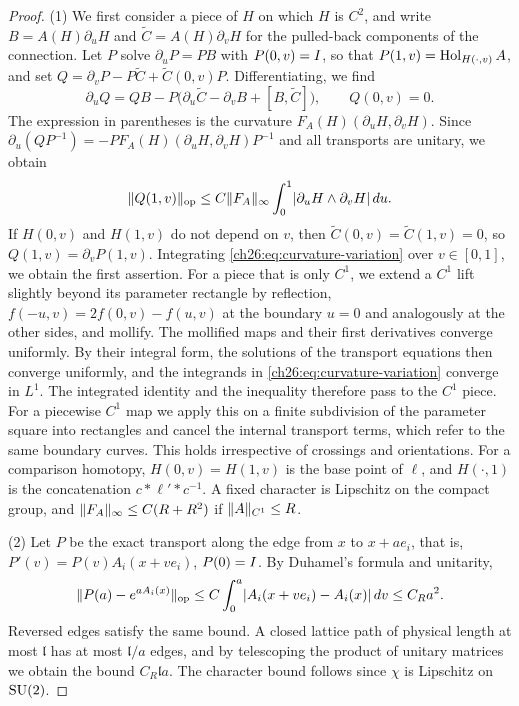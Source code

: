 \begin{proof}
(1) We first consider a piece of $H$ on which $H$ is $C^2$, and write $B=A(H)\partial_uH$ and $\widetilde C=A(H)\partial_vH$ for the pulled-back components of the connection. Let $P$ solve $\partial_uP=PB$ with $P(0,v)=I$, so that $P(1,v)=\operatorname{Hol}_{H(\cdot,v)}A$, and set $Q=\partial_vP-P\widetilde C+\widetilde C(0,v)P$. Differentiating, we find
\[
 \partial_uQ=QB-P\bigl(\partial_u\widetilde C-\partial_vB+[B,\widetilde C]\bigr),\qquad Q(0,v)=0 .
\]
The expression in parentheses is the curvature $F_A(H)(\partial_uH,\partial_vH)$. Since $\partial_u(QP^{-1})=-PF_A(H)(\partial_uH,\partial_vH)P^{-1}$ and all transports are unitary, we obtain
\begin{equation}\label{ch26:eq:curvature-variation}
 \lVert Q(1,v)\rVert_{\mathrm{op}}\le C\lVert F_A\rVert_\infty\int_0^1\lvert \partial_uH\wedge\partial_vH\rvert\,du .
\end{equation}
If $H(0,v)$ and $H(1,v)$ do not depend on $v$, then $\widetilde C(0,v)=\widetilde C(1,v)=0$, so $Q(1,v)=\partial_vP(1,v)$. Integrating \eqref{ch26:eq:curvature-variation} over $v\in[0,1]$, we obtain the first assertion. For a piece that is only $C^1$, we extend a $C^1$ lift slightly beyond its parameter rectangle by reflection, $f(-u,v)=2f(0,v)-f(u,v)$ at the boundary $u=0$ and analogously at the other sides, and mollify. The mollified maps and their first derivatives converge uniformly. By their integral form, the solutions of the transport equations then converge uniformly, and the integrands in \eqref{ch26:eq:curvature-variation} converge in $L^1$. The integrated identity and the inequality therefore pass to the $C^1$ piece. For a piecewise $C^1$ map we apply this on a finite subdivision of the parameter square into rectangles and cancel the internal transport terms, which refer to the same boundary curves. This holds irrespective of crossings and orientations. For a comparison homotopy, $H(0,v)=H(1,v)$ is the base point of $\ell$, and $H(\cdot,1)$ is the concatenation $c*\ell'*c^{-1}$. A fixed character is Lipschitz on the compact group, and $\lVert F_A\rVert_\infty\le C(R+R^2)$ if $\lVert A\rVert_{C^1}\le R$.

(2) Let $P$ be the exact transport along the edge from $x$ to $x+ae_i$, that is, $P'(v)=P(v)A_i(x+ve_i)$, $P(0)=I$. By Duhamel's formula and unitarity,
\[
 \lVert P(a)-e^{aA_i(x)}\rVert_{\mathrm{op}}\le C\int_0^a\lvert A_i(x+ve_i)-A_i(x)\rvert\,dv\le C_Ra^2 .
\]
Reversed edges satisfy the same bound. A closed lattice path of physical length at most $\mathfrak l$ has at most $\mathfrak l/a$ edges, and by telescoping the product of unitary matrices we obtain the bound $C_R\mathfrak la$. The character bound follows since $\chi$ is Lipschitz on $\mathrm{SU}(2)$.


\end{proof}
